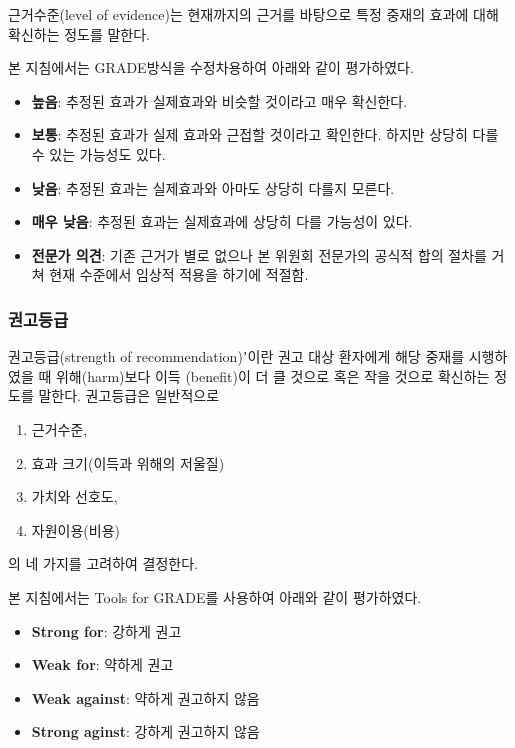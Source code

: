 \documentclass[]{book}
\providecommand{\tightlist}{%
  \setlength{\itemsep}{0pt}\setlength{\parskip}{0pt}}
\begin{document}
근거수준(level of evidence)는 현재까지의 근거를 바탕으로 특정 중재의 효과에 대해 확신하는 정도를 말한다.

본 지침에서는 GRADE방식을 수정차용하여 아래와 같이 평가하였다.

\begin{itemize}
\tightlist
\item
  \textbf{높음}: 추정된 효과가 실제효과와 비슷할 것이라고 매우 확신한다.
\item
  \textbf{보통}: 추정된 효과가 실제 효과와 근접할 것이라고 확인한다. 하지만 상당히 다를 수 있는 가능성도 있다.
\item
  \textbf{낮음}: 추정된 효과는 실제효과와 아마도 상당히 다를지 모른다.
\item
  \textbf{매우 낮음}: 추정된 효과는 실제효과에 상당히 다를 가능성이 있다.
\item
  \textbf{전문가 의견}: 기존 근거가 별로 없으나 본 위원회 전문가의 공식적 합의 절차를 거쳐 현재 수준에서 임상적 적용을 하기에 적절함.
\end{itemize}

\hypertarget{section-60}{%
\subsubsection*{권고등급}\label{section-60}}

권고등급(strength of recommendation)ʼ이란
권고 대상 환자에게 해당 중재를 시행하였을 때 위해(harm)보다 이득 (benefit)이 더 클 것으로 혹은 작을 것으로 확신하는 정도를 말한다.
권고등급은 일반적으로

\begin{enumerate}
\def\labelenumi{\arabic{enumi}.}
\tightlist
\item
  근거수준,
\item
  효과 크기(이득과 위해의 저울질)
\item
  가치와 선호도,
\item
  자원이용(비용)
\end{enumerate}

의 네 가지를 고려하여 결정한다.

본 지침에서는 Tools for GRADE를 사용하여 아래와 같이 평가하였다.

\begin{itemize}
\tightlist
\item
  \textbf{Strong for}: 강하게 권고
\item
  \textbf{Weak for}: 약하게 권고
\item
  \textbf{Weak against}: 약하게 권고하지 않음
\item
  \textbf{Strong aginst}: 강하게 권고하지 않음
\end{itemize}


\end{document}
